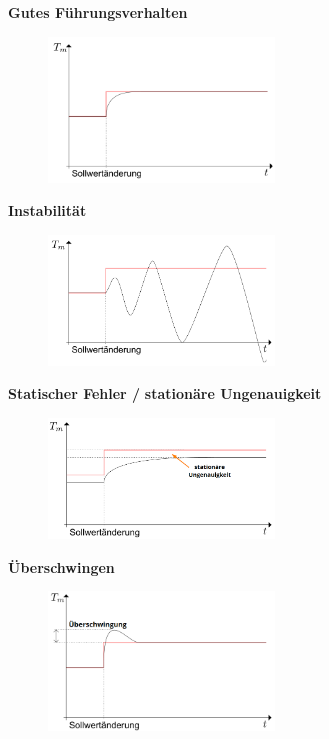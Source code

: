 \documentclass[
  10pt,
  a4paper,
  onecolumn]{article}
\numberwithin{equation}{section}
\begin{document}
\textbf{Gutes Führungsverhalten}

\begin{figure}[H]

{\centering \includegraphics[width=6cm,height=\textheight]{images/fuhrungsverhalten/gutes_verhalten.png}

}

\end{figure}

\textbf{Instabilität}

\begin{figure}[H]

{\centering \includegraphics[width=6cm,height=\textheight]{images/fuhrungsverhalten/instabil.png}

}

\end{figure}

\textbf{Statischer Fehler /} \textbf{stationäre Ungenauigkeit}

\begin{figure}[H]

{\centering \includegraphics[width=6cm,height=\textheight]{images/fuhrungsverhalten/stationary.png}

}

\end{figure}

\textbf{Überschwingen}

\begin{figure}[H]

{\centering \includegraphics[width=6cm,height=\textheight]{images/fuhrungsverhalten/uberschwingung.png}

}

\end{figure}
\end{document}

